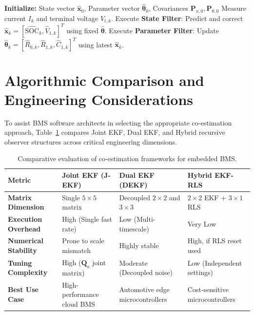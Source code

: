 \begin{algorithm}[htbp]
\caption{Multi-Time-Scale Dual EKF Framework}
\label{alg:dual_ekf_framework}
\small
\begin{algorithmic}[1]
\State \textbf{Initialize:} State vector $\hat{\mathbf{x}}_0$, Parameter vector $\hat{\boldsymbol{\theta}}_0$, Covariances $\mathbf{P}_{x,0}, \mathbf{P}_{\theta,0}$
    \State Measure current $I_k$ and terminal voltage $V_{t,k}$.
    \State Execute \textbf{State Filter}: Predict and correct $\hat{\mathbf{x}}_k = [\widehat{\text{SOC}}_k, \hat{V}_{1,k}]^T$ using fixed $\hat{\boldsymbol{\theta}}$.
     
        \State Execute \textbf{Parameter Filter}: Update $\hat{\boldsymbol{\theta}}_k = [\hat{R}_{0,k}, \hat{R}_{1,k}, \hat{C}_{1,k}]^T$ using latest $\hat{\mathbf{x}}_k$.
    \EndIf
\EndFor
\end{algorithmic}
\end{algorithm}

\section{Algorithmic Comparison and Engineering Considerations}
\label{sec:coest_comparison}

To assist BMS software architects in selecting the appropriate co-estimation approach, Table~\ref{tab:ch7_coest_comparison} compares Joint EKF, Dual EKF, and Hybrid recursive observer structures across critical engineering dimensions.

\begin{table}[htbp]
\centering
\caption{Comparative evaluation of co-estimation frameworks for embedded BMS.}
\label{tab:ch7_coest_comparison}
\small
\renewcommand{\arraystretch}{1.2}
\begin{tabularx}{\textwidth}{|p{3.0cm}|X|X|X|}
\hline
\textbf{Metric} & \textbf{Joint EKF (J-EKF)} & \textbf{Dual EKF (DEKF)} & \textbf{Hybrid EKF-RLS} \\
\hline
\textbf{Matrix Dimension} & Single $5 \times 5$ matrix & Decoupled $2 \times 2$ and $3 \times 3$ & $2 \times 2$ EKF + $3 \times 1$ RLS \\
\hline
\textbf{Execution Overhead} & High (Single fast rate) & Low (Multi-timescale) & Very Low \\
\hline
\textbf{Numerical Stability} & Prone to scale mismatch & Highly stable & High, if RLS reset used \\
\hline
\textbf{Tuning Complexity} & High ($\mathbf{Q}_a$ joint matrix) & Moderate (Decoupled noise) & Low (Independent settings) \\
\hline
\textbf{Best Use Case} & High-performance cloud BMS & Automotive edge microcontrollers & Cost-sensitive microcontrollers \\
\hline
\end{tabularx}
\end{table}

